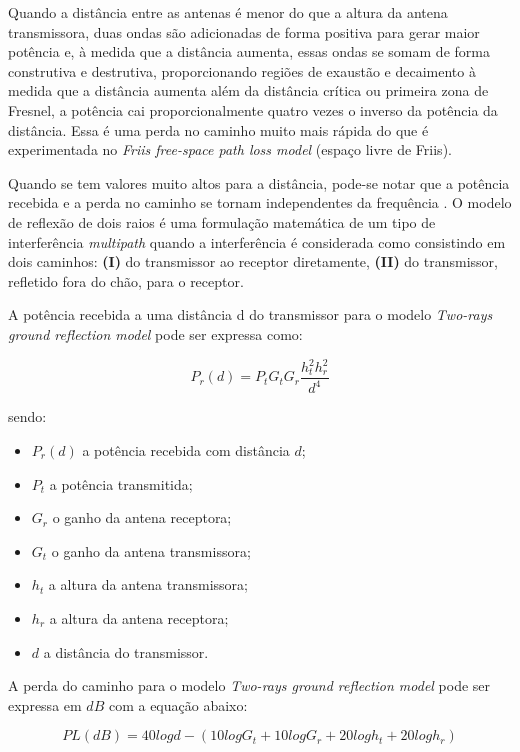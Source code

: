 \documentclass[
	12pt,				%
	twoside,			%
	a4paper,			%
	english,			%
	french,				%
	spanish,			%
	brazil				%
	]{abntex2}
\begin{document}
Quando a distância entre as antenas é menor do que a altura da antena
transmissora, duas ondas são adicionadas de forma positiva para gerar
maior potência e, à medida que a distância aumenta, essas ondas se somam
de forma construtiva e destrutiva, proporcionando regiões de exaustão e
decaimento à medida que a distância aumenta além da distância crítica ou
primeira zona de Fresnel, a potência cai proporcionalmente quatro vezes
o inverso da potência da distância. Essa é uma perda no caminho muito
mais rápida do que é experimentada no \emph{Friis free-space path loss
model} (espaço livre de Friis).

Quando se tem valores muito altos para a distância, pode-se notar que a
potência recebida e a perda no caminho se tornam independentes da
frequência \cite{RAPPAPORT}. O modelo de reflexão de dois raios é uma
formulação matemática de um tipo de interferência \emph{multipath}
quando a interferência é considerada como consistindo em dois caminhos:
\textbf{(I)} do transmissor ao receptor diretamente, \textbf{(II)} do
transmissor, refletido fora do chão, para o receptor.

A potência recebida a uma distância d do transmissor para o modelo
\emph{Two-rays ground reflection model} pode ser expressa como:

\begin{equation}
    P_{r}(d) = P_{t}G_{t}G_{r}\frac{h^{2}_{t}h^{2}_{r}}{d^{4}}
\end{equation}

sendo:

\begin{itemize}
\item
  \(P_{r}(d)\) a potência recebida com distância \(d\);
\item
  \(P_{t}\) a potência transmitida;
\item
  \(G_{r}\) o ganho da antena receptora;
\item
  \(G_{t}\) o ganho da antena transmissora;
\item
  \(h_{t}\) a altura da antena transmissora;
\item
  \(h_{r}\) a altura da antena receptora;
\item
  \(d\) a distância do transmissor.
\end{itemize}

A perda do caminho para o modelo \emph{Two-rays ground reflection model}
pode ser expressa em \(dB\) com a equação abaixo:

\begin{equation}
PL(dB) = 40 log d -(10 log G_{t} + 10 log G_{r} + 20 log h_{t} + 20 log h_{r})
\end{equation}
\end{document}

